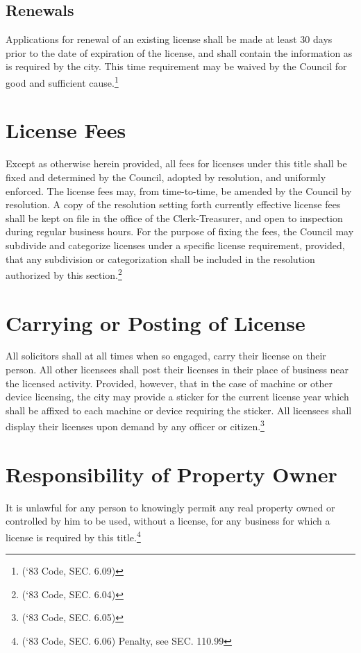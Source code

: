 \subsection{Renewals}
Applications for renewal of an existing license shall be made at least 30 days prior to the date of expiration of the license, and shall contain the information as is required by the city.  This time requirement may be waived by the Council for good and sufficient cause.\footnote{(‘83 Code, SEC. 6.09)}

\section{License Fees}
Except as otherwise herein provided, all fees for licenses under this title shall be fixed and determined by the Council, adopted by resolution, and uniformly enforced.  The license fees may, from time-to-time, be amended by the Council by resolution.  A copy of the resolution setting forth currently effective license fees shall be kept on file in the office of the Clerk-Treasurer, and open to inspection during regular business hours.  For the purpose of fixing the fees, the Council may subdivide and categorize licenses under a specific license requirement, provided, that any subdivision or categorization shall be included in the resolution authorized by this section.\footnote{(‘83 Code, SEC. 6.04)}

\section{Carrying or Posting of License}
All solicitors shall at all times when so engaged, carry their license on their person.  All other licensees shall post their licenses in their place of business near the licensed activity.  Provided, however, that in the case of machine or other device licensing, the city may provide a sticker for the current license year which shall be affixed to each machine or device requiring the sticker.  All licensees shall display their licenses upon demand by any officer or citizen.\footnote{(‘83 Code, SEC. 6.05)}

\section{Responsibility of Property Owner}
It is unlawful for any person to knowingly permit any real property owned or controlled by him to be used, without a license, for any business for which a license is required by this title.\footnote{(‘83 Code, SEC. 6.06)  Penalty, see SEC. 110.99}

